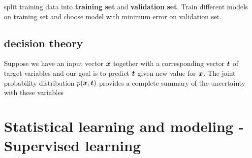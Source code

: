 \documentclass[11pt]{article}
\begin{document}
split training data into \textbf{training set} and \textbf{validation set}. Train different
models on training set and choose model with minimum error on validation set.
\subsection{decision theory}
\label{sec:orgc541245}
Suppose we have an input vector \(\boldsymbol{x}\) together with a corresponding vector
\(\boldsymbol{t}\) of target variables and our goal is to predict \(\boldsymbol{t}\) given new
value for \(\boldsymbol{x}\). The joint probability distribution \(p(\boldsymbol{x},\boldsymbol{t})\)
provides a complete summary of the uncertainty with these variables
\section{Statistical learning and modeling - Supervised learning}
\label{sec:org086ebdc}
\end{document}
